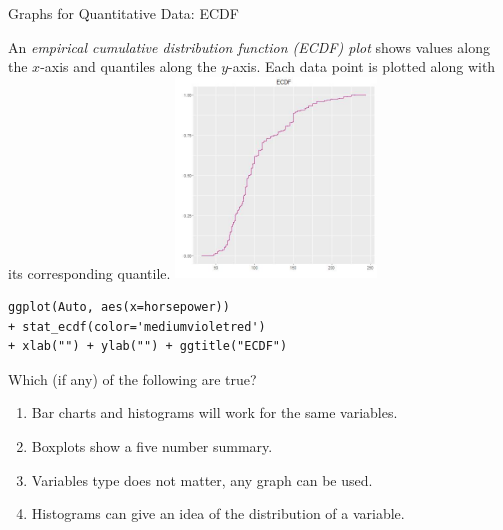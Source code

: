 \documentclass[xcolor=svgnames, 10pt, handout]{beamer}
\begin{document}
\begin{frame}[fragile]{Graphs for Quantitative Data: ECDF}
\begin{multicols}{2}
An \emph{empirical cumulative distribution function (ECDF) plot} shows values along the $x$-axis and quantiles along the $y$-axis.
\vfill
Each data point is plotted along with its corresponding quantile.
\vfill
\newpage
\includegraphics[width=0.4\textwidth]{images/ecdf}
\end{multicols}
\vfill
\begin{Verbatim}[xleftmargin=.5em, xrightmargin=.5em, frame=single, label=Boxplot Example, framesep=0.5em, fontsize=\small]
ggplot(Auto, aes(x=horsepower))
+ stat_ecdf(color='mediumvioletred')
+ xlab("") + ylab("") + ggtitle("ECDF")
\end{Verbatim}
\end{frame}


\begin{frame}[fragile]
\begin{question}
Which (if any)  of the following are true?
\begin{enumerate}
\item Bar charts and histograms will work for the same variables. \onslide<+-> \pxmark
\item Boxplots show a five number summary. \pcmark
\item Variables type does not matter, any graph can be used. \pxmark
\item Histograms can give an idea of the distribution of a variable. \pcmark
\end{enumerate}
\end{question}
\end{frame}
\end{document}
